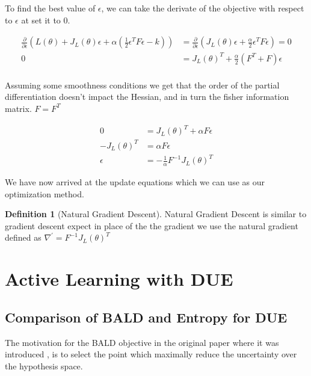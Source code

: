 \documentclass[12pt, a4paper]{report}
\theoremstyle{definition}
\theoremstyle{definition}
\newtheorem{definition}{Definition}[section]
\theoremstyle{definition}
\begin{document}
To find the best value of $\epsilon$, we can take the derivate of the objective with respect to $\epsilon$ at set it to $0$.


\begin{align}
   \frac{\partial}{\partial \epsilon} \left( L\left( \theta \right) + J_L \left( \theta\right) \epsilon + \alpha \left( \frac{1}{2} \epsilon^T F \epsilon - k\right) \right) &=  \frac{\partial}{\partial \epsilon} \left( J_L \left( \theta\right) \epsilon + \frac{\alpha}{2} \epsilon^T F \epsilon  \right) = 0\\
  0 &=  J_L \left( \theta\right)^T + \frac{\alpha}{2}  \left(F^T + F \right)\epsilon\\
\end{align}

Assuming some smoothness conditions we get that the order of the partial differentiation doesn't impact the Hessian, and in turn the fisher information matrix. $F = F^T$

\begin{align}
   0 &=  J_L \left( \theta\right)^T + \alpha F \epsilon\\
   - J_L \left( \theta\right)^T &=  \alpha F \epsilon\\
  \epsilon &=  - \frac{1}{\alpha} F^{-1} J_L \left( \theta\right) ^T
\end{align} 

We have now arrived at the update equations which we can use as our optimization method.


\begin{definition}[Natural Gradient Descent]
    Natural Gradient Descent is similar to gradient descent expect in place of the the gradient we use the natural gradient defined as $\nabla^{\prime} =  F^{-1} J_L \left( \theta \right)^T$
\end{definition}






\chapter{Active Learning with DUE}
\label{Chap5}



\section{Comparison of BALD and Entropy for DUE}

The motivation for the BALD objective in the original paper where it was introduced \cite{houlsby2011bayesian}, is to select the point which maximally reduce the uncertainty over the hypothesis space.
\end{document}
